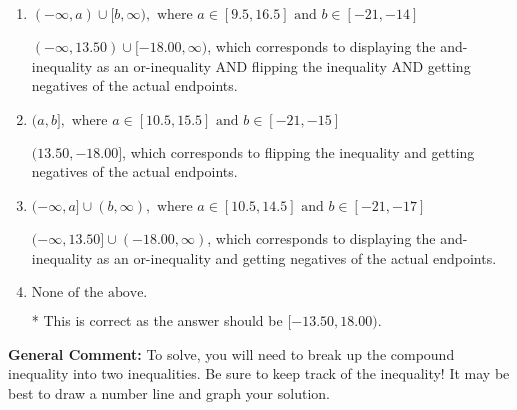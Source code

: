 \documentclass{extbook}[14pt]
\begin{document}
\begin{enumerate}
{\begin{enumerate}[label=\Alph*.]
$[13.50, -18.00)$, which is the correct interval but negatives of the actual endpoints.
\item \( (-\infty, a) \cup [b, \infty), \text{ where } a \in [9.5, 16.5] \text{ and } b \in [-21, -14] \)

$(-\infty, 13.50) \cup [-18.00, \infty)$, which corresponds to displaying the and-inequality as an or-inequality AND flipping the inequality AND getting negatives of the actual endpoints.
\item \( (a, b], \text{ where } a \in [10.5, 15.5] \text{ and } b \in [-21, -15] \)

$(13.50, -18.00]$, which corresponds to flipping the inequality and getting negatives of the actual endpoints.
\item \( (-\infty, a] \cup (b, \infty), \text{ where } a \in [10.5, 14.5] \text{ and } b \in [-21, -17] \)

$(-\infty, 13.50] \cup (-18.00, \infty)$, which corresponds to displaying the and-inequality as an or-inequality and getting negatives of the actual endpoints.
\item \( \text{None of the above.} \)

* This is correct as the answer should be $[-13.50, 18.00)$.
\end{enumerate}

\textbf{General Comment:} To solve, you will need to break up the compound inequality into two inequalities. Be sure to keep track of the inequality! It may be best to draw a number line and graph your solution.
}
\end{enumerate}
\end{document}
